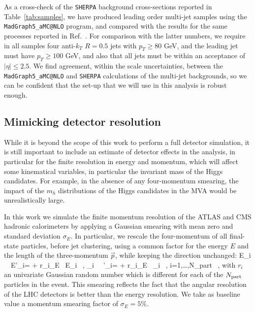 As a cross-check of the {\tt SHERPA}
background cross-sections reported in Table~\ref{tab:samples}, we have produced leading order
multi-jet samples
using the {\tt MadGraph5\_aMC@NLO} program, and compared with the results for the same processes reported in
Ref.~\cite{Alwall:2014hca}.
%
For comparison with the latter numbers, 
we require in all samples four anti-$k_T$ $R=0.5$ jets with $p_T \ge 80 $ GeV, and the leading jet must have $p_T \ge 100$ GeV, and
also that all jets must be within an acceptance of $|\eta| \le 2.5 $.
%
We find agreement, within the scale uncertainties, between the {\tt MadGraph5\_aMC@NLO} and {\tt SHERPA} calculations of the multi-jet
backgrounds, so we can be confident that the set-up that we will use in this analysis is robust enough.


\subsection{Mimicking detector resolution}


While it is beyond the scope of this work to perform a full
detector simulation, it is still important to include an estimate of detector
effects in the analysis, in particular for the finite resolution
in energy and momentum, which will affect some kinematical variables, in particular
the invariant mass of the Higgs candidates.
%
For example, in the absence of any four-momentum smearing, the impact of the $m_h$
distributions of the Higgs candidates in the MVA
would be unrealistically large.


In this work we simulate the finite momentum resolution of the ATLAS and CMS
hadronic calorimeters by applying a Gaussian smearing
with mean zero and standard deviation $\sigma_E$.
%
In particular, we rescale the four-momentum of all
final-state particles, before jet clustering, using
a common factor for the energy $E$ and the length of the
three-momentum $\vec{p}$, while keeping the direction unchanged:
%
\be
\label{eq:smearing}
E_i \, \to \, E'_i= + r_i\cdot\sigma_E \rp\, E_i \, ,\quad
{}_i \, \to \, '_i= + r_i\cdot\sigma_E \rp\, _i \, , \quad
i=1,\ldots,N_{\rm part} \, ,
\ee
with $r_i$ an univariate Gaussian random number which is different for each
of the $N_{\rm part}$ particles in the event.
%
This smearing reflects the fact that the angular resolution of the LHC detectors
is better than the energy resolution.
%
We take as baseline value a momentum smearing
factor of $\sigma_E=5\%$.

